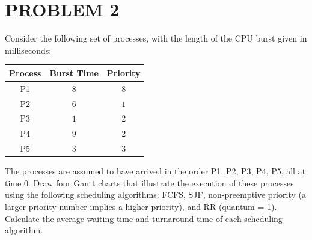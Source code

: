 \documentclass[13pt,a4paper]{article}
\begin{document}
	\section{PROBLEM 2}
		Consider the following set of processes, with the length of the CPU burst given in milliseconds:
		\begin{center}
			\begin{tabular}{c|c|c}
				Process & Burst Time & Priority \\
				\hline
				P1 & $8$ & $8$ \\
				P2 & $6$ & $1$ \\
				P3 & $1$ & $2$ \\
				P4 & $9$ & $2$ \\
				P5 & $3$ & $3$
			\end{tabular}
		\end{center}
		The processes are assumed to have arrived in the order P1, P2, P3, P4, P5, all at time 0. Draw four Gantt charts that illustrate the execution of these processes using the following scheduling algorithms: FCFS, SJF, non-preemptive priority (a larger priority number implies a higher priority), and RR (quantum = 1). Calculate the average waiting time and turnaround time of each scheduling algorithm.
		\newpage
\end{document}
